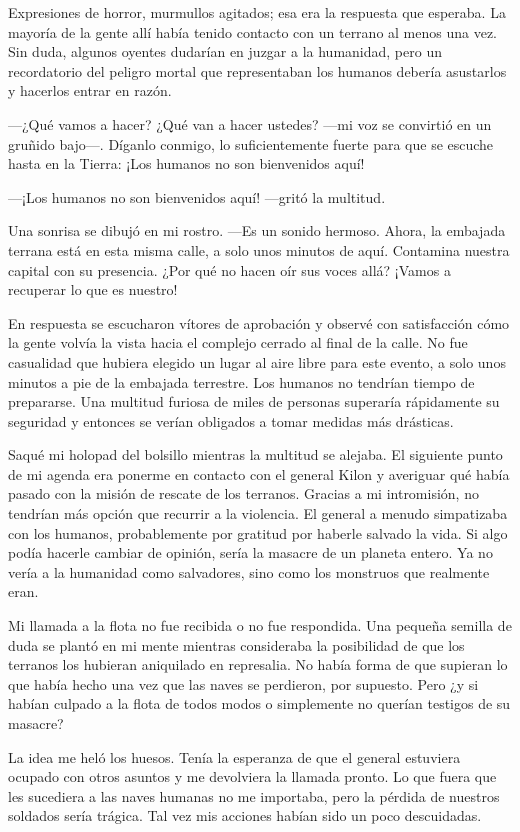 Expresiones de horror, murmullos agitados; esa era la respuesta que esperaba. La mayoría de la gente allí había tenido contacto con un terrano al menos una vez. Sin duda, algunos oyentes dudarían en juzgar a la humanidad, pero un recordatorio del peligro mortal que representaban los humanos debería asustarlos y hacerlos entrar en razón.

 —¿Qué vamos a hacer? ¿Qué van a hacer ustedes? —mi voz se convirtió en un gruñido bajo—. Díganlo conmigo, lo suficientemente fuerte para que se escuche hasta en la Tierra: ¡Los humanos no son bienvenidos aquí!

—¡Los humanos no son bienvenidos aquí! —gritó la multitud.

Una sonrisa se dibujó en mi rostro. —Es un sonido hermoso. Ahora, la embajada terrana está en esta misma calle, a solo unos minutos de aquí. Contamina nuestra capital con su presencia. ¿Por qué no hacen oír sus voces allá? ¡Vamos a recuperar lo que es nuestro!

En respuesta se escucharon vítores de aprobación y observé con satisfacción cómo la gente volvía la vista hacia el complejo cerrado al final de la calle. No fue casualidad que hubiera elegido un lugar al aire libre para este evento, a solo unos minutos a pie de la embajada terrestre. Los humanos no tendrían tiempo de prepararse. Una multitud furiosa de miles de personas superaría rápidamente su seguridad y entonces se verían obligados a tomar medidas más drásticas.

Saqué mi holopad del bolsillo mientras la multitud se alejaba. El siguiente punto de mi agenda era ponerme en contacto con el general Kilon y averiguar qué había pasado con la misión de rescate de los terranos. Gracias a mi intromisión, no tendrían más opción que recurrir a la violencia. El general a menudo simpatizaba con los humanos, probablemente por gratitud por haberle salvado la vida. Si algo podía hacerle cambiar de opinión, sería la masacre de un planeta entero. Ya no vería a la humanidad como salvadores, sino como los monstruos que realmente eran.

Mi llamada a la flota no fue recibida o no fue respondida. Una pequeña semilla de duda se plantó en mi mente mientras consideraba la posibilidad de que los terranos los hubieran aniquilado en represalia. No había forma de que supieran lo que había hecho una vez que las naves se perdieron, por supuesto. Pero ¿y si habían culpado a la flota de todos modos o simplemente no querían testigos de su masacre?

La idea me heló los huesos. Tenía la esperanza de que el general estuviera ocupado con otros asuntos y me devolviera la llamada pronto. Lo que fuera que les sucediera a las naves humanas no me importaba, pero la pérdida de nuestros soldados sería trágica. Tal vez mis acciones habían sido un poco descuidadas.

